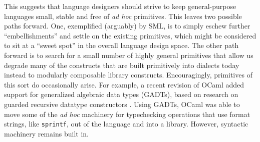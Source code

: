 This suggests that language designers should strive to keep general-purpose languages small, stable and free of \emph{ad hoc} primitives. This leaves  two possible paths forward. One, exemplified (arguably) by SML, is to simply eschew further ``embellishments'' and settle on the existing primitives, which might be considered to sit at a ``sweet spot'' in the overall language design space. %
The other path forward is to search for a small number of highly general primitives that allow us degrade many of the constructs that are built primitively into dialects today instead to modularly composable library constructs. 
Encouragingly, primitives of this sort do occasionally arise. For example, a recent revision of OCaml added support for  generalized algebraic data types (GADTs), based on research on guarded recursive datatype constructors \cite{XiCheChe03}. Using GADTs, OCaml was able to move some of the \emph{ad hoc} machinery for typechecking operations that use format strings, like \texttt{sprintf}, out of the language and into a library. However, syntactic machinery remains  built in. 





